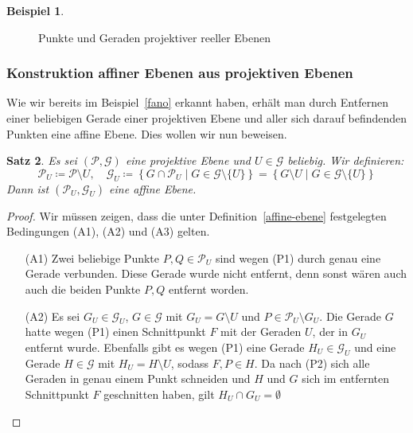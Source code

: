 \documentclass[hidelinks]{article}
\theoremstyle{plain}
\newtheorem{thm}{Satz}[section]
\theoremstyle{definition}
\newtheorem{bsp}[thm]{Beispiel}
\theoremstyle{rem}
\newcommand{\pu}{\mathcal{P}_U}
\newcommand{\gu}{\mathcal{G}_U}
\begin{document}
\begin{sloppypar}
\begin{bsp}
\begin{figure}[H]
	\caption{Punkte und Geraden projektiver reeller Ebenen}
\end{figure}
\end{bsp}


\subsubsection{Konstruktion affiner Ebenen aus projektiven Ebenen} \label{konstr-aff-aus-proj}
Wie wir bereits im Beispiel~\ref{fano} erkannt haben, erhält man durch Entfernen einer beliebigen Gerade einer projektiven Ebene und aller sich darauf befindenden Punkten eine affine Ebene. Dies wollen wir nun beweisen.
\begin{thm} \label{projektive-zu-affinen}
Es sei $(\mathcal{P},\mathcal{G})$ eine projektive Ebene und $U\in\mathcal{G}$ beliebig. Wir definieren:
\begin{equation*}
	\pu\coloneqq\mathcal{P}\setminus{U},\quad \gu\coloneqq\left\{G\cap\pu\mid G\in\mathcal{G}\setminus\{U\}\right\}=\left\{G\setminus U\mid G\in\mathcal{G}\setminus \{U\}\right\}
\end{equation*}
Dann ist $(\pu,\gu)$ eine affine Ebene.
\end{thm}
\begin{proof}
Wir müssen zeigen, dass die unter Definition~\ref{affine-ebene} festgelegten Bedingungen (A1), (A2) und (A3) gelten.
\begin{enumerate}
	\item[(A1)] Zwei beliebige Punkte $P,Q\in\pu$ sind wegen (P1) durch genau eine Gerade verbunden. Diese Gerade wurde nicht entfernt, denn sonst wären auch auch die beiden Punkte $P,Q$ entfernt worden.
	\item[(A2)] Es sei $G_U\in\gu$, $G\in\mathcal{G}$ mit $G_U=G\setminus U$ und $P\in\pu\setminus G_U$. Die Gerade $G$ hatte wegen (P1) einen Schnittpunkt $F$ mit der Geraden $U$, der in $G_U$ entfernt wurde. Ebenfalls gibt es wegen (P1) eine Gerade $H_U\in\gu$ und eine Gerade $H\in\mathcal{G}$ mit $H_U=H\setminus U$, sodass $F,P\in H$. Da nach (P2) sich alle Geraden in genau einem Punkt schneiden und $H$ und $G$ sich im entfernten Schnittpunkt $F$ geschnitten haben, gilt $H_U\cap G_U=\emptyset$\\

\end{enumerate}
\end{proof}
\end{sloppypar}
\end{document}
